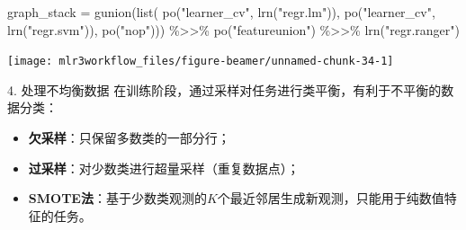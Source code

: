 \documentclass[
  11pt,
  ignorenonframetext,
  dvipsnames,UTF8]{beamer}
\newenvironment{Shaded}{\begin{snugshade}}{\end{snugshade}}
\newcommand{\CommentTok}[1]{\textcolor[rgb]{0.56,0.35,0.01}{\textit{#1}}}
\newcommand{\FunctionTok}[1]{\textcolor[rgb]{0.00,0.00,0.00}{#1}}
\newcommand{\NormalTok}[1]{#1}
\newcommand{\OtherTok}[1]{\textcolor[rgb]{0.56,0.35,0.01}{#1}}
\newcommand{\SpecialCharTok}[1]{\textcolor[rgb]{0.00,0.00,0.00}{#1}}
\newcommand{\StringTok}[1]{\textcolor[rgb]{0.31,0.60,0.02}{#1}}
\providecommand{\tightlist}{%
  \setlength{\itemsep}{0pt}\setlength{\parskip}{0pt}}
\begin{document}
\begin{frame}[fragile]{}
\protect\hypertarget{section-24}{}
\begin{Shaded}
\begin{Highlighting}[]
\NormalTok{graph\_stack }\OtherTok{=} \FunctionTok{gunion}\NormalTok{(}\FunctionTok{list}\NormalTok{(}
    \FunctionTok{po}\NormalTok{(}\StringTok{"learner\_cv"}\NormalTok{, }\FunctionTok{lrn}\NormalTok{(}\StringTok{"regr.lm"}\NormalTok{)),}
    \FunctionTok{po}\NormalTok{(}\StringTok{"learner\_cv"}\NormalTok{, }\FunctionTok{lrn}\NormalTok{(}\StringTok{"regr.svm"}\NormalTok{)),}
    \FunctionTok{po}\NormalTok{(}\StringTok{"nop"}\NormalTok{))) }\SpecialCharTok{\%\textgreater{}\textgreater{}\%}
  \FunctionTok{po}\NormalTok{(}\StringTok{"featureunion"}\NormalTok{) }\SpecialCharTok{\%\textgreater{}\textgreater{}\%}
  \FunctionTok{lrn}\NormalTok{(}\StringTok{"regr.ranger"}\NormalTok{)}
\end{Highlighting}
\end{Shaded}
\end{frame}

\begin{frame}[fragile]{}
\protect\hypertarget{section-25}{}
\begin{Shaded}
\end{Shaded}

\begin{center}\texttt{[image: mlr3workflow\_files/figure-beamer/unnamed-chunk-34-1]} \end{center}
\end{frame}

\begin{frame}[fragile]{4. 处理不均衡数据}
\protect\hypertarget{ux5904ux7406ux4e0dux5747ux8861ux6570ux636e}{}
在训练阶段，通过采样对任务进行类平衡，有利于不平衡的数据分类：

\begin{itemize}
\tightlist
\item
  \textbf{欠采样}：只保留多数类的一部分行；
\item
  \textbf{过采样}：对少数类进行超量采样（重复数据点）；
\item
  \textbf{SMOTE法}：基于少数类观测的\(K\)个最近邻居生成新观测，只能用于纯数值特征的任务。
\end{itemize}

\begin{Shaded}
\end{Shaded}
\end{frame}
\end{document}
